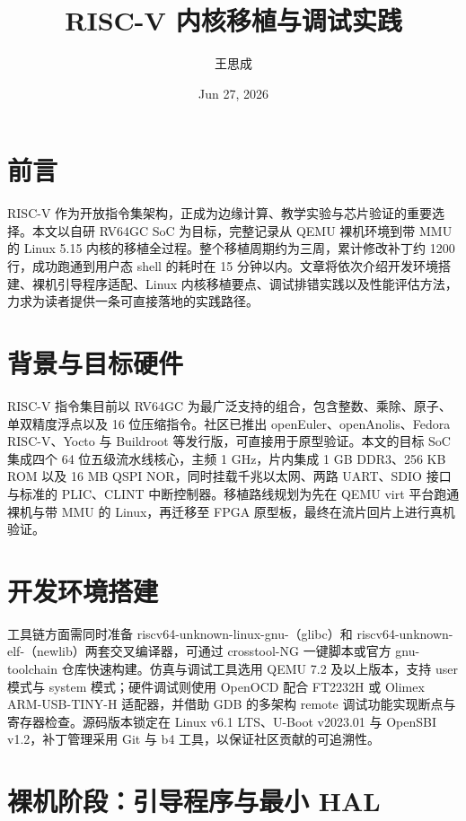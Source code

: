 \title{RISC-V 内核移植与调试实践}
\author{王思成}
\date{Jun 27, 2026}
\maketitle
\chapter{前言}
RISC-V 作为开放指令集架构，正成为边缘计算、教学实验与芯片验证的重要选择。本文以自研 RV64GC SoC 为目标，完整记录从 QEMU 裸机环境到带 MMU 的 Linux 5.15 内核的移植全过程。整个移植周期约为三周，累计修改补丁约 1200 行，成功跑通到用户态 shell 的耗时在 15 分钟以内。文章将依次介绍开发环境搭建、裸机引导程序适配、Linux 内核移植要点、调试排错实践以及性能评估方法，力求为读者提供一条可直接落地的实践路径。\par
\chapter{背景与目标硬件}
RISC-V 指令集目前以 RV64GC 为最广泛支持的组合，包含整数、乘除、原子、单双精度浮点以及 16 位压缩指令。社区已推出 openEuler、openAnolis、Fedora RISC-V、Yocto 与 Buildroot 等发行版，可直接用于原型验证。本文的目标 SoC 集成四个 64 位五级流水线核心，主频 1 GHz，片内集成 1 GB DDR3、256 KB ROM 以及 16 MB QSPI NOR，同时挂载千兆以太网、两路 UART、SDIO 接口与标准的 PLIC、CLINT 中断控制器。移植路线规划为先在 QEMU virt 平台跑通裸机与带 MMU 的 Linux，再迁移至 FPGA 原型板，最终在流片回片上进行真机验证。\par
\chapter{开发环境搭建}
工具链方面需同时准备 riscv64-unknown-linux-gnu-（glibc）和 riscv64-unknown-elf-（newlib）两套交叉编译器，可通过 crosstool-NG 一键脚本或官方 gnu-toolchain 仓库快速构建。仿真与调试工具选用 QEMU 7.2 及以上版本，支持 user 模式与 system 模式；硬件调试则使用 OpenOCD 配合 FT2232H 或 Olimex ARM-USB-TINY-H 适配器，并借助 GDB 的多架构 remote 调试功能实现断点与寄存器检查。源码版本锁定在 Linux v6.1 LTS、U-Boot v2023.01 与 OpenSBI v1.2，补丁管理采用 Git 与 b4 工具，以保证社区贡献的可追溯性。\par
\chapter{裸机阶段：引导程序与最小 HAL}

